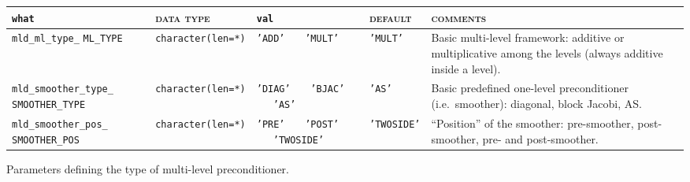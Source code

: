 \bsideways
\begin{center}
\begin{tabular}{|p{5cm}|l|p{2cm}|l|p{7cm}|}
\hline
\verb|what|              & \textsc{data type}        &  \verb|val|      &  \textsc{default}  &
\textsc{comments} \\ \hline
\verb|mld_ml_type_| \break \verb|ML_TYPE|     & \verb|character(len=*)|
                         & \texttt{'ADD'} \ \ \ \texttt{'MULT'}   
                         & \texttt{'MULT'}
                         & Basic multi-level framework: additive or multiplicative
                           among the levels (always additive inside a level).         \\ \hline 
\verb|mld_smoother_type_| \break \verb|SMOOTHER_TYPE|  & \verb|character(len=*)|
                         & \texttt{'DIAG'} \ \ \ \texttt{'BJAC'} \ \ \ \texttt{'AS'}
                         & \texttt{'AS'}
                         & Basic predefined one-level preconditioner
                         (i.e.\ smoother): diagonal, 
                           block Jacobi, AS. \\ \hline
\verb|mld_smoother_pos_| \break \verb|SMOOTHER_POS| & \verb|character(len=*)|
                         & \texttt{'PRE'} \ \ \ \texttt{'POST'} \ \ \ \texttt{'TWOSIDE'}
                         & \texttt{'TWOSIDE'}
                         & ``Position'' of the smoother: pre-smoother, post-smoother, 
                           pre- and post-smoother. \\
\hline
\end{tabular}
\end{center}
\caption{Parameters defining the type of multi-level preconditioner.
\label{tab:p_type}}                       
\esideways
                   
